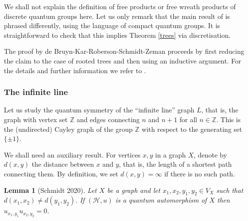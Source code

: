 \documentclass[a4paper]{amsart}
\newcommand*{\Hc}{\mathcal{H}}
\numberwithin{equation}{section}
\theoremstyle{change}
\newtheorem{lemma}[theorem]{Lemma}
\begin{document}
We shall not explain the definition of free products or free wreath products of discrete quantum groups here. Let us only remark that the main result of \cite{DEBRUYN_KAR_ROBERSON_SCHMIDT_ZEMAN_quantumautomorphismtrees} is phrased differently, using the language of compact 
quantum groups. It is straightforward to check that this implies Theorem \ref{trees} via discretisation. 

The proof by de Bruyn-Kar-Roberson-Schmidt-Zeman proceeds by first reducing the claim to the case of rooted trees and then using an inductive argument. 
For the details and further information we refer to \cite{DEBRUYN_KAR_ROBERSON_SCHMIDT_ZEMAN_quantumautomorphismtrees}.   


\subsubsection{The infinite line} 

Let us study the quantum symmetry of the ``infinite line'' graph $ L $, that is, the graph with vertex set $ \mathbb{Z} $ and edges connecting $ n $ and $ n + 1 $ 
for all $ n \in \mathbb{Z} $. This is the (undirected) Cayley graph of the group $ \mathbb{Z} $ with respect to the generating set $ \{\pm 1\} $. 

We shall need an auxiliary result. 
For vertices $ x,y $ in a graph $ X $, denote by $ d(x,y) $ the distance between $ x $ and $ y $, that is, the length 
of a shortest path connecting them. By definition, we set $ d(x,y) = \infty $ if there is no such path. 

\begin{lemma}[Schmidt 2020] \label{distancelemma}
Let $ X $ be a graph and let $ x_1, x_2, y_1, y_2 \in V_X $ such that $ d(x_1, x_2) \neq d(y_1, y_2) $. If $ (\Hc, u) $ is a quantum automorphism of $ X $ 
then $ u_{x_1, y_1} u_{x_2, y_2} = 0 $. 
\end{lemma}
\end{document}
